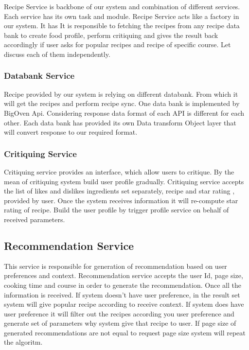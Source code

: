 Recipe Service is backbone of our system and combination of different services. Each service has its own task and module. Recipe Service acts like a factory in our system.  It has It is responsible to fetching the recipes from any recipe data bank to create food profile, perform critiquing and gives the result back accordingly if user asks for popular recipes and recipe of specific course. Let discuss each of them independently.

\subsubsection{Databank Service}

Recipe provided by our system is relying on different databank. From which it will get the recipes and perform recipe sync. One data bank is implemented by BigOven Api. Considering response data format of each API is different for each other. Each data bank has provided its own Data transform Object layer that will convert response to our required format. 

\subsubsection{Critiquing Service}

Critiquing service provides an interface, which allow users to critique. By the mean of critiquing system build user profile gradually.  Critiquing service accepts the list of likes and dislikes ingredients set separately, recipe and star rating , provided by user. Once the system receives information it will re-compute star rating of recipe. Build the user profile by trigger profile service on behalf of received parameters.

\subsection{Recommendation Service}

This service is responsible for generation of recommendation based on user preferences and context.  Recommendation service accepts the user Id, page size, cooking time and course in order to generate the recommendation. Once all the information is received. If system doesn’t have user preference, in the result set system will give popular recipe according to receive context. If system does have user preference it will filter out the recipes according you user preference and generate set of parameters why system give that recipe to user. If page size of generated recommendations are not equal to request page size system will repeat the algoritm. 
	
